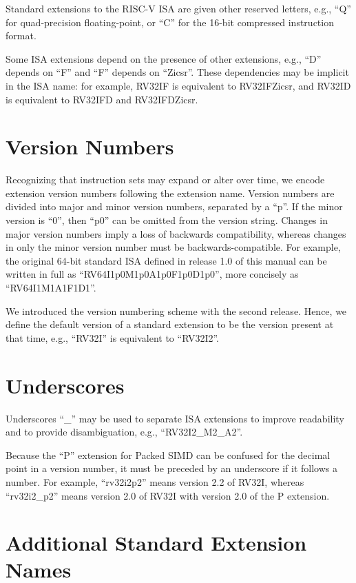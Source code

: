 Standard extensions to the RISC-V ISA are given other reserved
letters, e.g., ``Q'' for quad-precision floating-point, or
``C'' for the 16-bit compressed instruction format.

Some ISA extensions depend on the presence of other extensions, e.g., ``D''
depends on ``F'' and ``F'' depends on ``Zicsr''.  These dependencies may be
implicit in the ISA name: for example, RV32IF is equivalent to RV32IFZicsr,
and RV32ID is equivalent to RV32IFD and RV32IFDZicsr.

\section{Version Numbers}
Recognizing that instruction sets may expand or alter over time, we
encode extension version numbers following the extension name.  Version
numbers are divided into major and minor version numbers, separated by
a ``p''.  If the minor version is ``0'', then ``p0'' can be omitted
from the version string.  Changes in major version numbers imply a
loss of backwards compatibility, whereas changes in only the minor
version number must be backwards-compatible.  For example, the
original 64-bit standard ISA defined in release 1.0 of this manual can
be written in full as ``RV64I1p0M1p0A1p0F1p0D1p0'', more concisely as
``RV64I1M1A1F1D1''.

We introduced the version numbering scheme with the second release.  Hence, we
define the default version of a standard extension to be the version present at that
time, e.g., ``RV32I'' is equivalent to ``RV32I2''.

\section{Underscores}

Underscores ``\_'' may be used to separate ISA extensions to
improve readability and to provide disambiguation, e.g., ``RV32I2\_M2\_A2''.

Because the ``P'' extension for Packed SIMD can be confused for the decimal
point in a version number, it must be preceded by an underscore if it follows
a number.  For example, ``rv32i2p2'' means version 2.2 of RV32I, whereas
``rv32i2\_p2'' means version 2.0 of RV32I with version 2.0 of the P extension.

\section{Additional Standard Extension Names}

